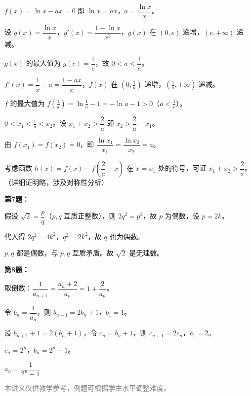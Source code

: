 \documentclass[12pt, a4paper]{ctexart}
\begin{document}
\begin{knowledgebox}[参考答案]
$f(x) = \ln x - ax = 0$ 即 $\ln x = ax$，$a = \dfrac{\ln x}{x}$。

设 $g(x) = \dfrac{\ln x}{x}$，$g'(x) = \dfrac{1 - \ln x}{x^2}$，$g(x)$ 在 $(0, e)$ 递增，$(e, +\infty)$ 递减。

$g(x)$ 的最大值为 $g(e) = \dfrac{1}{e}$，故 $0 < a < \dfrac{1}{e}$。

$f'(x) = \dfrac{1}{x} - a = \dfrac{1 - ax}{x}$，$f(x)$ 在 $(0, \frac{1}{a})$ 递增，$(\frac{1}{a}, +\infty)$ 递减。

$f$ 的最大值为 $f(\frac{1}{a}) = \ln\frac{1}{a} - 1 = -\ln a - 1 > 0$（$a < \frac{1}{e}$）。

$0 < x_1 < \frac{1}{a} < x_2$。设 $x_1 + x_2 > \dfrac{2}{a}$ 即 $x_2 > \dfrac{2}{a} - x_1$。

由 $f(x_1) = f(x_2) = 0$，即 $\dfrac{\ln x_1}{x_1} = \dfrac{\ln x_2}{x_2} = a$。

考虑函数 $h(x) = f(x) - f\left(\dfrac{2}{a} - x\right)$ 在 $x = x_1$ 处的符号，可证 $x_1 + x_2 > \dfrac{2}{a}$。（详细证明略，涉及对称性分析）

\bigskip

\textbf{第7题：}

假设 $\sqrt{2} = \dfrac{p}{q}$（$p, q$ 互质正整数），则 $2q^2 = p^2$，故 $p$ 为偶数，设 $p = 2k$。

代入得 $2q^2 = 4k^2$，$q^2 = 2k^2$，故 $q$ 也为偶数。

$p, q$ 都是偶数，与 $p, q$ 互质矛盾。故 $\sqrt{2}$ 是无理数。

\bigskip

\textbf{第8题：}

取倒数：$\dfrac{1}{a_{n+1}} = \dfrac{a_n + 2}{a_n} = 1 + \dfrac{2}{a_n}$。

令 $b_n = \dfrac{1}{a_n}$，则 $b_{n+1} = 2b_n + 1$，$b_1 = 1$。

设 $b_{n+1} + 1 = 2(b_n + 1)$，令 $c_n = b_n + 1$，则 $c_{n+1} = 2c_n$，$c_1 = 2$。

$c_n = 2^n$，$b_n = 2^n - 1$。

$\boxed{a_n = \dfrac{1}{2^n - 1}}$

\end{knowledgebox}

\vfill
\begin{center}
\small\textcolor{gray}{本讲义仅供教学参考，例题可根据学生水平调整难度。}
\end{center}
\end{document}
